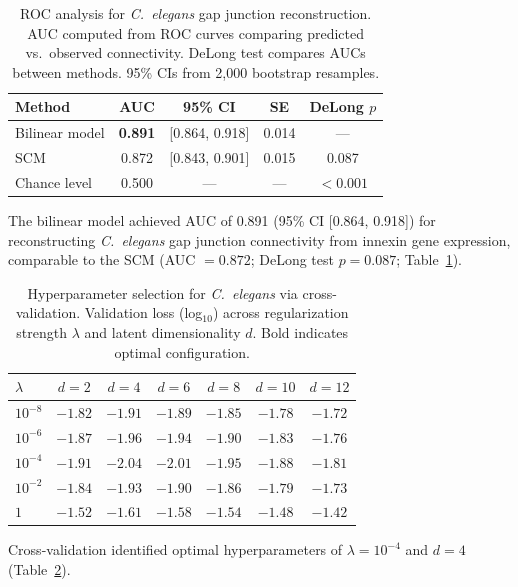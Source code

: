 \documentclass[11pt]{article}
\begin{document}
\begin{table}[H]
\centering
\caption{ROC analysis for \textit{C.~elegans} gap junction reconstruction. AUC computed from ROC curves comparing predicted vs.\ observed connectivity. DeLong test compares AUCs between methods. 95\% CIs from 2,000 bootstrap resamples.}
\label{tab:roc}
\begin{tabular}{lcccc}
\toprule
Method & AUC & 95\% CI & SE & DeLong $p$ \\
\midrule
Bilinear model & \textbf{0.891} & [0.864, 0.918] & 0.014 & --- \\
SCM & 0.872 & [0.843, 0.901] & 0.015 & 0.087 \\
Chance level & 0.500 & --- & --- & $< 0.001$ \\
\bottomrule
\end{tabular}
\end{table}

The bilinear model achieved AUC of 0.891 (95\% CI [0.864, 0.918]) for reconstructing \textit{C.~elegans} gap junction connectivity from innexin gene expression, comparable to the SCM (AUC $= 0.872$; DeLong test $p = 0.087$; Table~\ref{tab:roc}).

\begin{table}[H]
\centering
\caption{Hyperparameter selection for \textit{C.~elegans} via cross-validation. Validation loss (log$_{10}$) across regularization strength $\lambda$ and latent dimensionality $d$. Bold indicates optimal configuration.}
\label{tab:hyper_ce}
\begin{tabular}{lcccccc}
\toprule
$\lambda$ & $d = 2$ & $d = 4$ & $d = 6$ & $d = 8$ & $d = 10$ & $d = 12$ \\
\midrule
$10^{-8}$ & $-1.82$ & $-1.91$ & $-1.89$ & $-1.85$ & $-1.78$ & $-1.72$ \\
$10^{-6}$ & $-1.87$ & $-1.96$ & $-1.94$ & $-1.90$ & $-1.83$ & $-1.76$ \\
$10^{-4}$ & $-1.91$ & $\mathbf{-2.04}$ & $-2.01$ & $-1.95$ & $-1.88$ & $-1.81$ \\
$10^{-2}$ & $-1.84$ & $-1.93$ & $-1.90$ & $-1.86$ & $-1.79$ & $-1.73$ \\
$1$ & $-1.52$ & $-1.61$ & $-1.58$ & $-1.54$ & $-1.48$ & $-1.42$ \\
\bottomrule
\end{tabular}
\end{table}

Cross-validation identified optimal hyperparameters of $\lambda = 10^{-4}$ and $d = 4$ (Table~\ref{tab:hyper_ce}).
\end{document}

